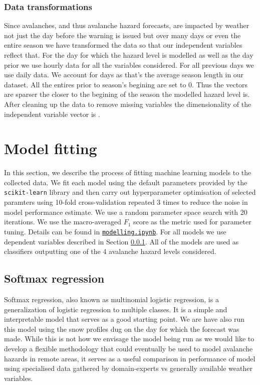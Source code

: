 \documentclass{article}
\begin{document}
\subsubsection{Data transformations}\label{sec:weather_data_trans}
	Since avalanches, and thus avalanche hazard forecasts, are impacted by weather not just the day before the warning is issued but over many days or even the entire season we have transformed the data so that our independent variables reflect that. For the day for which the hazard level is modelled as well as the day prior we use hourly data for all the variables considered. For all previous days we use daily data. We account for days as that's the average season length in our dataset. All the entires prior to season's begining are set to 0. Thus the vectors are sparser the closer to the begining of the season the modelled hazard level is. After cleaning up the data to remove missing variables the dimensionality of the independent variable vector is \unskip.

\section{Model fitting}

	In this section, we describe the process of fitting machine learning models to the collected data. We fit each model using the default parameters provided by the \texttt{scikit-learn} library and then carry out hyperparameter optimisation of selected paramters using 10-fold cross-validation repeated 3 times to reduce the noise in model performance estimate. We use a random parameter space search with 20 iterations. We use the macro-averaged $F_1$ score as the metric used for parameter tuning. Details can be found in \href{https://github.com/witgaw/avalanche-danger-level-forecast/blob/main/src/modelling.ipynb}{\texttt{modelling.ipynb}}.
	For all models we use dependent variables described in Section \ref{sec:weather_data_trans}.
	All of the models are used as classifiers outputting one of the 4 avalanche hazard levels considered.

\subsection{Softmax regression}

	Softmax regression, also known as multinomial logistic regression, is a generalization of logistic regression to multiple classes. It is a simple and interpretable model that serves as a good starting point.
	We are have also run this model using the snow profiles dug on the day for which the forecast was made. While this is not how we envisage the model being run as we would like to develop a flexible methodology that could eventually be used to model avalanche hazards in remote areas, it serves as a useful comparison in performance of model using specialised data gathered by domain-experts vs generally available weather variables.
\end{document}
